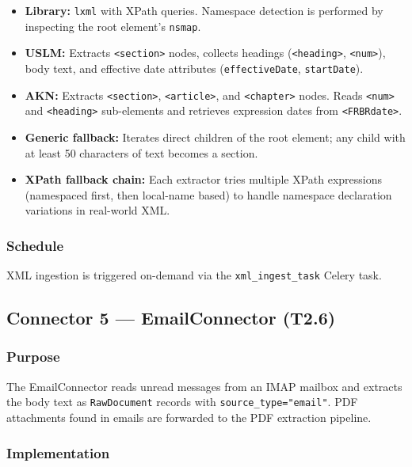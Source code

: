 \documentclass[12pt,a4paper]{article}
\begin{document}
\begin{itemize}[noitemsep]
  \item \textbf{Library:} \texttt{lxml} with XPath queries. Namespace detection is performed by inspecting the root element's \texttt{nsmap}.
  \item \textbf{USLM:} Extracts \texttt{<section>} nodes, collects headings (\texttt{<heading>}, \texttt{<num>}), body text, and effective date attributes (\texttt{effectiveDate}, \texttt{startDate}).
  \item \textbf{AKN:} Extracts \texttt{<section>}, \texttt{<article>}, and \texttt{<chapter>} nodes. Reads \texttt{<num>} and \texttt{<heading>} sub-elements and retrieves expression dates from \texttt{<FRBRdate>}.
  \item \textbf{Generic fallback:} Iterates direct children of the root element; any child with at least 50 characters of text becomes a section.
  \item \textbf{XPath fallback chain:} Each extractor tries multiple XPath expressions (namespaced first, then local-name based) to handle namespace declaration variations in real-world XML.
\end{itemize}

\subsubsection{Schedule}

XML ingestion is triggered on-demand via the \texttt{xml\_ingest\_task} Celery task.

\subsection{Connector 5 — EmailConnector (T2.6)}

\subsubsection{Purpose}

The EmailConnector reads unread messages from an IMAP mailbox and extracts the body text as \texttt{RawDocument} records with \texttt{source\_type="email"}. PDF attachments found in emails are forwarded to the PDF extraction pipeline.

\subsubsection{Implementation}
\end{document}
